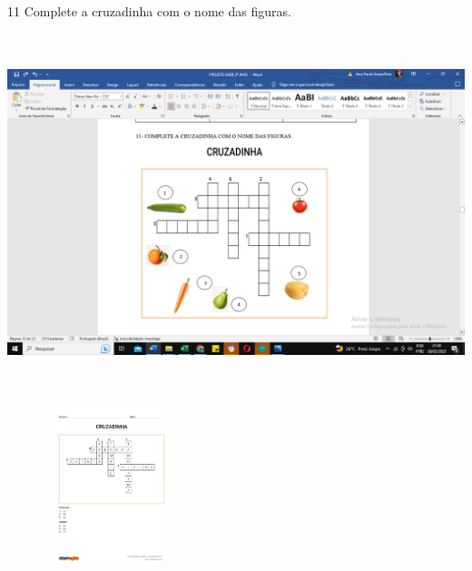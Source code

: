 \num{11} Complete a cruzadinha com o nome das figuras.


\includegraphics[width=5.69167in,height=4.10139in]{media/image40.png}

\includegraphics[width=2.40385in,height=1.79075in]{media/image41.jpeg}




